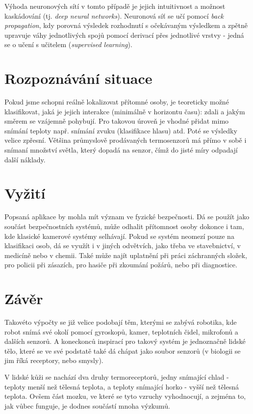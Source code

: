 \documentclass[10pt,a4paper]{article}
\begin{document}
  Výhoda neuronových sítí v tomto případě je jejich intuitivnost a možnost kaskádování (tj. {\it
  deep neural networks}). Neuronová síť se učí pomocí {\it back propagation}, kdy porovná výsledek
  rozhodnutí s očekávaným výsledkem a zpětně upravuje váhy jednotlivých spojů pomocí derivací přes
  jednotlivé vrstvy - jedná se o učení s učitelem ({\it supervised learning}).

  \section{Rozpoznávání situace}
  Pokud jsme schopni reálně lokalizovat přítomné osoby, je teoreticky možné klasifikovat, jaká je jejich
  interakce (minimálně v horizontu času): zdali a jakým směrem se vzájemně pohybují. Pro takovou
  úroveň je vhodné přidat mimo snímání teploty např. snímání zvuku (klasifikace hlasu) atd.
  Poté se výsledky velice zpřesní. Většina průmyslově prodávaných termosenzorů má přímo v sobě
  i snímaní množství světla, který dopadá na senzor, čímž do jisté míry odpadají další náklady.
  
  \section{Vyžití}
  Popsaná aplikace by mohla mít význam ve fyzické bezpečnosti. Dá se použít jako součást
  bezpečnostních systémů, může odhalit přítomnost osoby dokonce i tam, kde klasické kamerové
  systémy selhávají. Pokud se systém neomezí pouze na klasifikaci osob, dá se využít i v jiných
  odvětvích, jako třeba ve stavebnictví, v medicíně nebo v chemii. Také může najít uplatnění
  při práci záchranných složek, pro policii při zásazích, pro hasiče při zkoumání požárů,
  nebo při diagnostice.

  \section{Závěr}
  Takovéto výpočty se již velice podobají těm, kterými se zabývá robotika, kde robot snímá své
  okolí pomocí gyroskopů, kamer, teplotních čidel, mikrofonů a dalších senzorů. A koneckonců inspirací
  pro takový systém je jednoznačně lidské tělo, které se ve své podstatě také dá chápat jako soubor
  senzorů (v biologii se jim říká receptory, nebo smysly).
  
  V lidské kůži se nachází dva druhy termoreceptorů, jedny snímající chlad - teploty menší než
  tělesná teplota, a teploty snímající horko - vyšší než tělesná teplota. Ovšem část mozku,
  ve které se tyto vzruchy vyhodnocují, a zejména to, jak vůbec funguje, je dodnes součástí mnoha
  výzkumů.\cite{BodilySenses}

  \newpage
  \printbibliography
\end{document}
